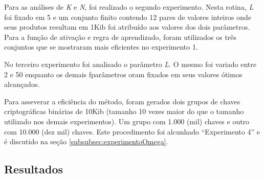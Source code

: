 \documentclass[12pt]{article}
\begin{document}
            Para as análises de \textit{K} e \textit{N}, foi realizado o segundo experimento. Nesta rotina, \textit{L} foi fixado em 5 e um conjunto finito contendo 12 pares de valores inteiros onde seus produtos resultam em 1Kib foi atribuído aos valores dos dois parâmetros. Para a função de ativação e regra de aprendizado, foram utilizados os três conjuntos que se mostraram mais eficientes no experimento 1.


            
            No terceiro experimento foi analisado o parâmetro \textit{L}. O mesmo foi variado entre 2 e 50 enquanto os demais fparâmetros oram fixados em seus valores ótimos alcançados.
            
            


            
            Para asseverar a eficiência do método, foram gerados dois grupos de chaves criptográficas binárias de 10Kib (tamanho 10 vezes maior do que o tamanho utilizado nos demais experimentos). Um grupo com 1.000 (mil) chaves e outro com 10.000 (dez mil) chaves. Este procedimento foi alcunhado ``Experimento 4'' e é discutido na seção \ref{subsubsec:experimentoOmega}.

        \subsection{Resultados}
        \label{subsec:resultados}
\end{document}
